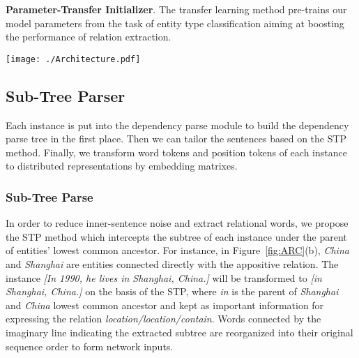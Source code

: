 \documentclass[11pt,a4paper]{article}
\begin{document}
  \textbf{Parameter-Transfer Initializer}. The transfer learning method pre-trains our model parameters from the task of entity type classification aiming at boosting the performance of relation extraction.

  \begin{figure*}[htbp]
    \centering
    \texttt{[image: ./Architecture.pdf]}
    \caption{Overall architecture of our model is used for distant supervised relation extraction, expressing the process of handling instances. There are two modules described in detail: (a) One is the BGRU; (b) Another is the STP, where words in the red brackets represent entities (better viewed in color).}
    \label{fig:ARC}
  \end{figure*}

  \subsection{Sub-Tree Parser}
  Each instance is put into the dependency parse module to build the dependency parse tree in the first place. Then we can tailor the sentences based on the STP method. Finally, we transform word tokens and position tokens of each instance to distributed representations by embedding matrixes.

  \subsubsection*{Sub-Tree Parse}
  In order to reduce inner-sentence noise and extract relational words, we propose the STP method which intercepts the subtree of each instance under the parent of entities' lowest common ancestor. For instance, in Figure~\ref{fig:ARC}(b), \emph{China} and \emph{Shanghai} are entities connected directly with the appositive relation. The instance \emph{[In 1990, he lives in Shanghai, China.]} will be transformed to \emph{[in Shanghai, China.]} on the basis of the STP, where \emph{in} is the parent of \emph{Shanghai} and \emph{China} lowest common ancestor and kept as important information for expressing the relation \emph{location/location/contain}. Words connected by the imaginary line indicating the extracted subtree are reorganized into their original sequence order to form network inputs.
\end{document}

